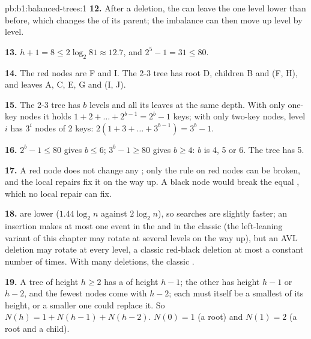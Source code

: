 \begin{solution}{pb:b1:balanced-trees:1}
\textbf{12.} After a deletion, the  can leave the  one level lower than before, which changes the  of its parent; the imbalance can then move up level by level.

\textbf{13.} $h + 1 = 8 \leq 2 \log_2 81 \approx 12.7$, and $2^5 - 1 = 31 \leq 80$.

\textbf{14.} The red nodes are F and I. The 2-3 tree has root D, children B and (F, H), and leaves A, C, E, G and
(I, J).

\textbf{15.} The 2-3 tree has $b$ levels and all its leaves at the same depth. With only one-key nodes it holds $1 + 2 +
\dots + 2^{b-1} = 2^b - 1$ keys; with only two-key nodes, level $i$ has $3^i$ nodes of 2 keys: $2(1 + 3 + \dots +
3^{b-1}) = 3^b - 1$.

\textbf{16.} $2^b - 1 \leq 80$ gives $b \leq 6$; $3^b - 1 \geq 80$ gives $b \geq 4$: $b$ is 4, 5 or 6. The tree has 5.

\textbf{17.} A red node does not change any ; only the rule on red nodes can be broken, and the local repairs
fix it on the way up. A black node would break the equal , which no local repair can fix.

\textbf{18.}  are lower ($1.44 \log_2 n$ against $2 \log_2 n$), so searches are slightly faster; an insertion
makes at most one  event in the  and in the classic  (the left-leaning variant of
this chapter may rotate at several levels on the way up), but an AVL deletion may rotate at every level, a classic
red-black deletion at most a constant number of times. With many deletions, the classic
.

\textbf{19.} A tree of height $h \geq 2$ has a  of height $h - 1$; the other has height $h - 1$ or $h - 2$, and the
fewest nodes come with $h - 2$; each  must itself be a smallest  of its height, or a smaller one could
replace it. So $N(h) = 1 + N(h - 1) + N(h - 2)$. $N(0) = 1$ (a root) and $N(1) = 2$ (a root and a child).


\end{solution}
